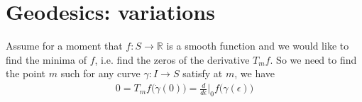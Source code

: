 \documentclass[10pt]{article}
\begin{document}
                        
            
            
            
                        
            
            
            
            
            
            

        \section{Geodesics: variations}
            Assume for a moment that $f: S\rightarrow\mathbb{R}$ is a smooth function and we would like to find the minima of $f$, i.e. find the zeros of the derivative $T_mf$. So we need to find the point $m$ such for any curve $\gamma: I\rightarrow S$ satisfy at $m$, we have
            \begin{equation*}
                \begin{aligned}
                    0 = T_mf\big(\dot{\gamma}(0)\big) = \frac{d}{d\epsilon}\bigg|_0f\big(\gamma(\epsilon)\big)
                \end{aligned}
            \end{equation*}
\end{document}
